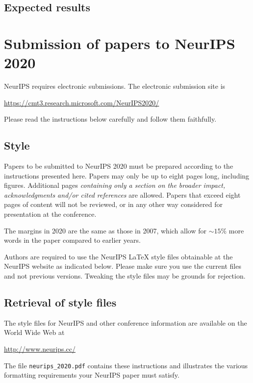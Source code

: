 \documentclass{article}
\begin{document}
\subsection{Expected results}



\section{Submission of papers to NeurIPS 2020}

NeurIPS requires electronic submissions.  The electronic submission site is
\begin{center}
  \url{https://cmt3.research.microsoft.com/NeurIPS2020/}
\end{center}

Please read the instructions below carefully and follow them faithfully.

\subsection{Style}

Papers to be submitted to NeurIPS 2020 must be prepared according to the
instructions presented here. Papers may only be up to eight pages long,
including figures. Additional pages \emph{containing only a section on the broader impact, acknowledgments and/or cited references} are allowed. Papers that exceed eight pages of content will not be reviewed, or in any other way considered for
presentation at the conference.

The margins in 2020 are the same as those in 2007, which allow for $\sim$$15\%$
more words in the paper compared to earlier years.

Authors are required to use the NeurIPS \LaTeX{} style files obtainable at the
NeurIPS website as indicated below. Please make sure you use the current files
and not previous versions. Tweaking the style files may be grounds for
rejection.

\subsection{Retrieval of style files}

The style files for NeurIPS and other conference information are available on
the World Wide Web at
\begin{center}
  \url{http://www.neurips.cc/}
\end{center}
The file \verb+neurips_2020.pdf+ contains these instructions and illustrates the
various formatting requirements your NeurIPS paper must satisfy.
\end{document}
